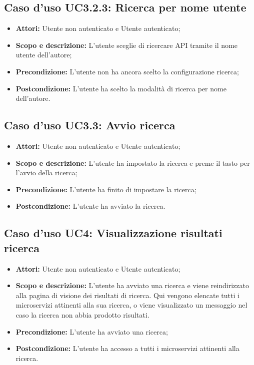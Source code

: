 \documentclass[12pt,a4paper,titlepage]{article}
\begin{document}
\subsection{Caso d'uso UC3.2.3: Ricerca per nome utente}
\begin{itemize}
	\item \textbf{Attori: }Utente non autenticato e Utente autenticato;
	\item \textbf{Scopo e descrizione: }L'utente sceglie di ricercare API tramite il nome utente dell'autore;
	\item \textbf{Precondizione: }L'utente non ha ancora scelto la configurazione ricerca;
	\item \textbf{Postcondizione: }L'utente ha scelto la modalità di ricerca per nome dell'autore.
\end{itemize}
\subsection{Caso d'uso UC3.3: Avvio ricerca}
\begin{itemize}
	\item \textbf{Attori: }Utente non autenticato e Utente autenticato;
	\item \textbf{Scopo e descrizione: }L'utente ha impostato la ricerca e preme il tasto per l'avvio della ricerca;
	\item \textbf{Precondizione: }L'utente ha finito di impostare la ricerca;
	\item \textbf{Postcondizione: }L'utente ha avviato la ricerca.
\end{itemize}
\subsection{Caso d'uso UC4: Visualizzazione risultati ricerca}
\begin{itemize}
	\item \textbf{Attori: }Utente non autenticato e Utente autenticato;
	\item \textbf{Scopo e descrizione: }L'utente ha avviato una ricerca e viene reindirizzato alla pagina di visione dei risultati di ricerca. Qui vengono elencate tutti i microservizi attinenti alla sua ricerca, o viene visualizzato un messaggio nel caso la ricerca non abbia prodotto risultati.
	\item \textbf{Precondizione: }L'utente ha avviato una ricerca;
	\item \textbf{Postcondizione: }L'utente ha accesso a tutti i microservizi attinenti alla ricerca.
\end{itemize}
\end{document}
